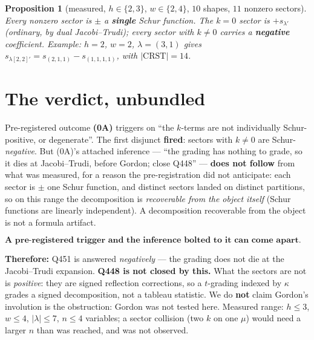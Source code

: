 \documentclass[11pt]{article}
\theoremstyle{plain}\newtheorem{proposition}{Proposition}
\theoremstyle{remark}\newtheorem{remark}[proposition]{Remark}
\begin{document}
\begin{proposition}[measured, $h\in\{2,3\}$, $w\in\{2,4\}$, $10$ shapes, $11$ nonzero sectors]
Every nonzero sector is $\pm$ a \textbf{single} Schur function. The $k=0$ sector is
$+s_{\lambda'}$ (ordinary, by dual Jacobi--Trudi); every sector with $k\ne0$ carries a
\textbf{negative} coefficient. Example: $h=2$, $w=2$, $\lambda=(3,1)$ gives
$s_{\lambda[2,2]'}=s_{(2,1,1)}-s_{(1,1,1,1)}$, with $|\mathrm{CRST}|=14$.
\end{proposition}

\section*{The verdict, unbundled}
Pre-registered outcome \textbf{(0A)} triggers on ``the $k$-terms are not individually
Schur-positive, or degenerate''. The first disjunct \textbf{fired}: sectors with $k\ne0$ are
Schur-\emph{negative}. But (0A)'s attached inference --- ``the grading has nothing to grade, so
it dies at Jacobi--Trudi, before Gordon; close Q448'' --- \textbf{does not follow} from what was
measured, for a reason the pre-registration did not anticipate: each sector is $\pm$ one Schur
function, and distinct sectors landed on distinct partitions, so on this range the
decomposition is \emph{recoverable from the object itself} (Schur functions are linearly
independent). A decomposition recoverable from the object is not a formula artifact.

\[
\boxed{\textbf{A pre-registered trigger and the inference bolted to it can come apart. Report the trigger; re-derive the inference.}}
\]

\noindent\textbf{Therefore:} Q451 is answered \emph{negatively} --- the grading does not die at
the Jacobi--Trudi expansion. \textbf{Q448 is not closed by this.} What the sectors are not is
\emph{positive}: they are signed reflection corrections, so a $t$-grading indexed by $\kappa$
grades a signed decomposition, not a tableau statistic. We do \textbf{not} claim Gordon's
involution is the obstruction: Gordon was not tested here. Measured range: $h\le3$, $w\le4$,
$|\lambda|\le7$, $n\le4$ variables; a sector collision (two $k$ on one $\mu$) would need a
larger $n$ than was reached, and was not observed.
\end{document}
